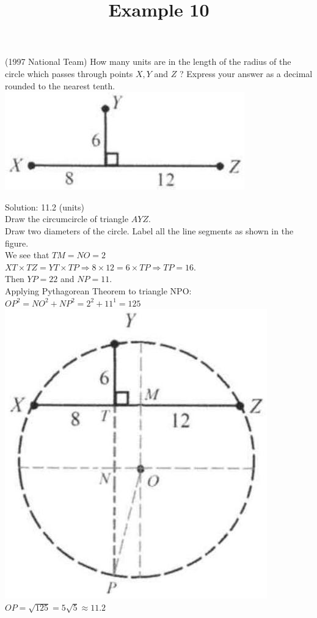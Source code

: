 \documentclass{article}
\title{Example 10}
\date{}
\begin{document}
\maketitle

(1997 National Team) How many units are in the length of the radius of the circle which passes through points \(X, Y\) and \(Z\) ? Express your answer as a decimal rounded to the nearest tenth.\\
\centering
\includegraphics[width=\textwidth]{images/problem_image_1.jpg}

Solution: 11.2 (units)\\
Draw the circumcircle of triangle \(A Y Z\).\\
Draw two diameters of the circle. Label all the line segments as shown in the figure.\\
We see that \(T M=N O=2\)\\
\(X T \times T Z=Y T \times T P \Rightarrow 8 \times 12=6 \times T P \Rightarrow T P=16\).\\
Then \(Y P=22\) and \(N P=11\).\\
Applying Pythagorean Theorem to triangle NPO:\\
\(O P^{2}=N O^{2}+N P^{2}=2^{2}+11^{1}=125\)\\
\includegraphics[width=\textwidth]{images/reasoning_image_1.jpg} \(O P=\sqrt{125}=5 \sqrt{5} \approx 11.2\)
\end{document}
